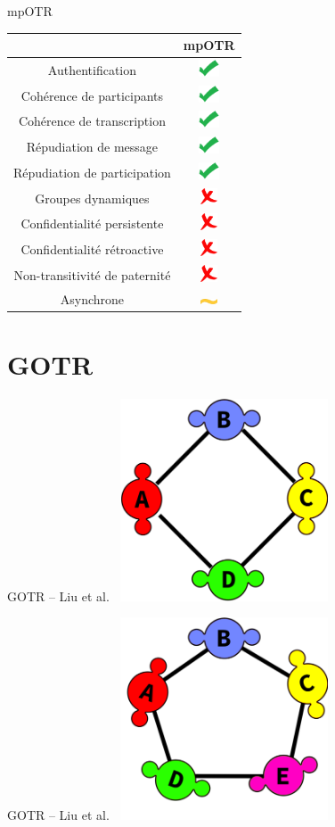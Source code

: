 \documentclass{beamer}
\newcommand{\okay}{\includegraphics[height=0.5cm]{img/check.png}}
\newcommand{\nope}{\includegraphics[height=0.5cm]{img/cross.png}}
\newcommand{\sortof}{\includegraphics[width=0.5cm]{img/tilde.png}}
\begin{document}
\begin{frame}{mpOTR}
	\center
  	\begin{tabular}{c|c}
			                              & mpOTR  \\
			\hline
  		Authentification              & \okay  \\
  		\hline
  		Cohérence de participants     & \okay  \\
  		Cohérence de transcription    & \okay  \\
  		\hline
  		Répudiation de message        & \okay  \\
  		Répudiation de participation  & \okay  \\
  		\hline
  		Groupes dynamiques            & \nope  \\
  		\hline
  		Confidentialité persistente   & \nope  \\
  		Confidentialité rétroactive   & \nope  \\
  		Non-transitivité de paternité & \nope  \\
  		\hline
  		Asynchrone                    & \sortof
    \end{tabular}
\end{frame}


\section{GOTR}
\begin{frame}{GOTR -- Liu et al.~\cite{gotr}}
	\center
	\includegraphics[height=6cm]{img/group_ring4.png}
\end{frame}

\begin{frame}{GOTR -- Liu et al.~\cite{gotr}}
	\center
	\includegraphics[height=6cm]{img/group_ring5.png}
\end{frame}
\end{document}
